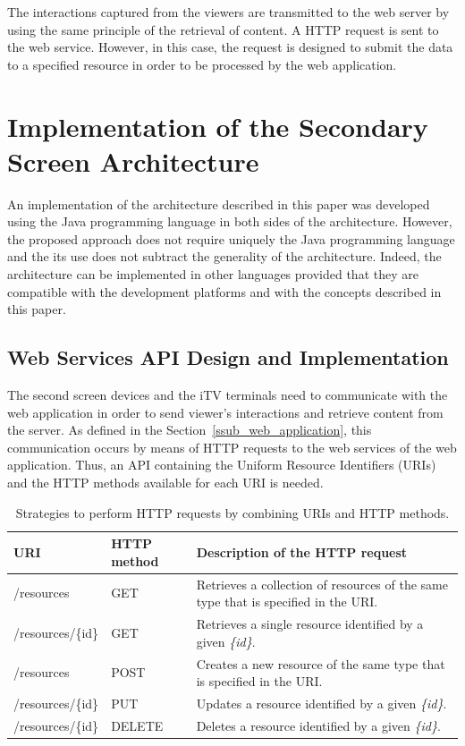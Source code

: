 \documentclass[journal]{IEEEtran}
\begin{document}
The interactions captured from the viewers are transmitted to the web server by using the same principle of the retrieval of content. A HTTP request is sent to the web service. However, in this case, the request is designed to submit the data to a specified resource in order to be processed by the web application.

\section{Implementation of the Secondary Screen Architecture}

An implementation of the architecture described in this paper was developed using the Java programming language in both sides of the architecture. However, the proposed approach does not require uniquely the Java programming language and the its use does not subtract the generality of the architecture. Indeed, the architecture can be implemented in other languages provided that they are compatible with the development platforms and with the concepts described in this paper.

\subsection{Web Services API Design and Implementation}

The second screen devices and the iTV terminals need to communicate with the web application in order to send viewer's interactions and retrieve content from the server. As defined in the Section~\ref{ssub_web_application}, this communication occurs by means of HTTP requests to the web services of the web application. Thus, an API containing the Uniform Resource Identifiers (URIs) and the HTTP methods available for each URI is needed.

\begin{table}
	\caption{Strategies to perform HTTP requests by combining URIs and HTTP methods.}
	\label{table_web_serv_design}
	\centering
	\begin{tabular}{|m{1.5cm}|>{\centering}m{1cm}|m{5cm}|}
	\hline
	\textbf{URI}&\textbf{HTTP method}&\textbf{Description of the HTTP request}\tabularnewline
	\hline
	/resources & GET & Retrieves a collection of resources of the same type that is specified in the URI. \tabularnewline
	\hline
	/resources/\{id\} & GET & Retrieves a single resource identified by a given \emph{\{id\}}.\tabularnewline
	\hline
	/resources & POST & Creates a new resource of the same type that is specified in the URI.\tabularnewline
	\hline
	/resources/\{id\} & PUT & Updates a resource identified by a given \emph{\{id\}}.\tabularnewline
	\hline
	/resources/\{id\} & DELETE & Deletes a resource identified by a given \emph{\{id\}}.
	\tabularnewline
	\hline
	\end{tabular}
\end{table}
\end{document}
